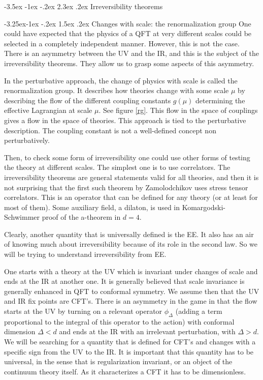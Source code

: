 \documentclass[11pt]{article}
\makeatletter
\renewcommand\section{\@startsection {section}{1}{\z@}%
                                 {-3.5ex \@plus -1ex \@minus -.2ex}%
                                   {2.3ex \@plus.2ex}%
                                   {\normalfont\large\bfseries}}
\renewcommand\subsection{\@startsection{subsection}{2}{\z@}%
                                   {-3.25ex\@plus -1ex \@minus -.2ex}%
                                     {1.5ex \@plus .2ex}%
                                     {\normalfont\bfseries}}
\numberwithin{equation}{section}
\makeatother
\begin{document}
\newpage
 
\section{Irreversibility theorems}

\subsection{Changes with scale: the renormalization group}
One could have expected that the physics of a QFT at very different scales could be selected in a completely independent manner. However, this is not the case. There is an asymmetry between the UV and the IR, and this is the subject of the irreversibility theorems. They allow us to grasp some aspects of this asymmetry. 

In the perturbative approach, the change of physics with scale is called the renormalization group. It describes how theories change with some scale $\mu$ by describing the flow of the different coupling constants $g(\mu)$ determining the effective Lagrangian at scale $\mu$. See figure \ref{rg}. This flow in the space of couplings gives a flow in the space of theories. 
 This approach is tied to the perturbative description. The coupling constant is not a well-defined concept non perturbatively. 

Then, to check some form of irreversibility one could use other forms of testing the theory at different scales. The simplest one is to use correlators. The irreversibility theorems are general statements valid for all theories, and then it is not surprising that the first such theorem by Zamolodchikov uses stress tensor correlators.  This is an operator that can be defined for any theory (or at least for most of them). Some auxiliary field, a dilaton, is used in Komargodski-Schwimmer proof of the a-theorem in $d=4$.

Clearly, another quantity that is universally defined is the EE. It also has an air of knowing much about irreversibility because of its role in the second law. So we will be trying to understand irreversibility from EE.
  
One starts with a theory at the UV which is invariant under changes of scale and ends at the IR at another one. It is generally believed that scale invariance is generally enhanced in QFT to conformal symmetry. We assume then that the UV and IR fix points are CFT's. There is an asymmetry in the game in that the flow starts at the UV by turning on a relevant operator $\phi_\Delta$ (adding a term proportional to the integral of this operator to the action) with conformal dimension $\Delta< d$ and ends at the IR with an irrelevant perturbation, with $\Delta>d$. 
We will be searching for a quantity that is defined for CFT's and changes with a specific sign from the UV to the IR. It is important that this quantity has to be universal, in the sense that is regularization invariant, or an object of the continuum theory itself. As it characterizes a CFT it has to be dimensionless.   
\end{document}
